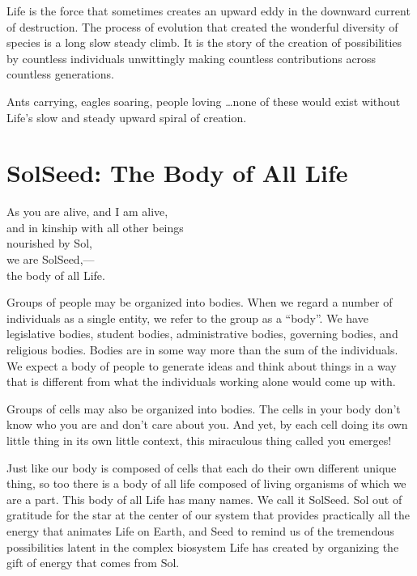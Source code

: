 \documentclass[ebook,12pt,openany,twoside]{memoir}
\newcommand{\tab}{\hspace*{2em}}
\newcommand{\imagefacingchapter}[1]{
  \cleartoverso
  \clearpage \null
  \thispagestyle{cleared}
  \AddToShipoutPictureBG*{%
    \AtStockLowerLeft{%
      \texttt{[image: \#1]}
    }
  }
  \clearpage
}
\begin{document}
Life is the force that sometimes creates an upward eddy in the downward current
of destruction. The process of evolution that created the wonderful diversity
of species is a long slow steady climb. It is the story of the creation of
possibilities by countless individuals unwittingly making countless
contributions across countless generations.

Ants carrying, eagles soaring, people loving \ldots none of these would exist
without Life's slow and steady upward spiral of creation.

\imagefacingchapter{images/BodyOfAllLife-cropped}
\chapter{SolSeed: The Body of All Life}

\setlength\epigraphwidth{2.4in}
\epigraph{
  As you are alive, and I am alive,\\
  and in kinship with all other beings\\
  nourished by Sol,\\
  \tab we are SolSeed,--- \\
  \tab the body of all Life.
}{}

\noindent Groups of people may be organized into bodies. When we regard a
number of individuals as a single entity, we refer to the group as a ``body''.
We have legislative bodies, student bodies, administrative bodies, governing
bodies, and religious bodies. Bodies are in some way more than the sum of the
individuals. We expect a body of people to generate ideas and think about
things in a way that is different from what the individuals working alone would
come up with.

Groups of cells may also be organized into bodies.  The cells in your body don't
know who you are and don't care about you. And yet, by each cell doing its own
little thing in its own little context, this miraculous thing called
you emerges!

Just like our body is composed of cells that each do their own different unique
thing, so too there is a body of all life composed of living organisms of which
we are a part. This body of all Life has many names. We call it SolSeed. Sol
out of gratitude for the star at the center of our system that provides
practically all the energy that animates Life on Earth, and Seed to remind us
of the tremendous possibilities latent in the complex biosystem Life has
created by organizing the gift of energy that comes from Sol.
\end{document}
